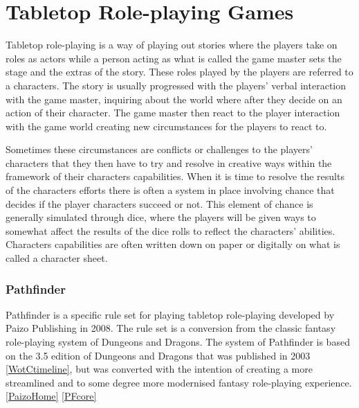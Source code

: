 \chapter*{Tabletop Role-playing Games}
Tabletop role-playing is a way of playing out stories where the players take on roles as actors while a person acting as what is called the game master sets the stage and the extras of the story. These roles played by the players are referred to a characters. The story is usually progressed with the players' verbal interaction with the game master, inquiring about the world where after they decide on an action of their character. The game master then react to the player interaction with the game world creating new circumstances for the players to react to. 

Sometimes these circumstances are conflicts or challenges to the players' characters that they then have to try and resolve in creative ways within the framework of their characters capabilities. When it is time to resolve the results of the characters efforts there is often a system in place involving chance that decides if the player characters succeed or not. This element of chance is generally simulated through dice, where the players will be given ways to somewhat affect the results of the dice rolls to reflect the characters' abilities. Characters capabilities are often written down on paper or digitally on what is called a character sheet.

\subsection*{Pathfinder}
Pathfinder is a specific rule set for playing tabletop role-playing developed by Paizo Publishing in 2008. The rule set is a conversion from the classic fantasy role-playing system of Dungeons and Dragons. The system of Pathfinder is based on the 3.5 edition of Dungeons and Dragons that was published in 2003 \ref{WotCtimeline}, but was converted with the intention of creating a more streamlined and to some degree more modernised fantasy role-playing experience. \ref{PaizoHome} \ref{PFcore}

